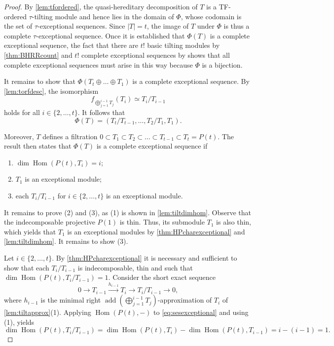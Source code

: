 \documentclass[10pt,twoside, a4paper,reqno]{amsart}
\DeclareMathOperator{\Hom}{Hom}
\DeclareMathOperator{\add}{add}
\theoremstyle{definition}
\begin{document}
\begin{proof}
    By \cref{lem:tfordered}, the quasi-hereditary decomposition of $T$ is a TF-ordered $\tau$-tilting module and hence lies in the domain of $\Phi$, whose codomain is the set of $\tau$-exceptional sequences. Since $|T|=t$, the image of $T$ under $\Phi$ is thus a complete $\tau$-exceptional sequence. Once it is established that $\Phi(T)$ is a complete exceptional sequence, the fact that there are $t!$ basic tilting modules by \cref{thm:BHRRcount} and $t!$ complete exceptional sequences by \cite[Introduction Thm.]{HillePloog2019} shows that all complete exceptional sequences must arise in this way because $\Phi$ is a bijection. 
    
    It remains to show that $\Phi(T_t \oplus \dots \oplus T_1)$ is a complete exceptional sequence. By \cref{lem:torfdesc}, the isomorphism
    \[ f_{\bigoplus_{j=1}^{i-1} T_j} (T_i) \simeq T_i/T_{i-1} \] 
	holds for all $i \in \{2, \dots, t\}$. It follows that 
	\[ \Phi(T) = (T_t/T_{t-1}, \dots, T_2/T_1, T_1). \]
	
	Moreover, $T$ defines a filtration $0 \subset T_1 \subset T_2 \subset \dots \subset T_{t-1} \subset T_t = P(t)$. The result \cite[Prop. 3.5]{HillePloog2019} then states that $\Phi(T)$ is a complete exceptional sequence if 
    \begin{enumerate}
        \item $\dim \Hom(P(t), T_i)=i$;
        \item $T_1$ is an exceptional module;
        \item each $T_i /T_{i-1}$ for $i \in \{ 2, \dots, t\}$ is an exceptional module.
    \end{enumerate}
    It remains to prove (2) and (3), as (1) is shown in \cref{lem:tiltdimhom}. Observe that the indecomposable projective $P(1)$ is thin. Thus, its submodule $T_1$ is also thin, which yields that $T_1$ is an exceptional modules by \cref{thm:HPcharexceptional} and \cref{lem:tiltdimhom}. It remains to show (3).
    
    Let $i \in \{2, \dots, t\}$. By \cref{thm:HPcharexceptional} it is necessary and sufficient to show that each $T_i/T_{i-1}$ is indecomposable, thin and such that $\dim \Hom(P(t), T_i/T_{i-1})=1$. Consider the short exact sequence
    \begin{equation}\label{eq:sesexceptional} 0 \to T_{i-1} \xrightarrow{h_{i-1}} T_i \to T_i/T_{i-1} \to 0, \end{equation}
    where $h_{i-1}$ is the minimal right $\add(\bigoplus_{j=1}^{i-1} T_j)$-approximation of $T_i$ of \cref{lem:tiltapprox}(1). Applying $\Hom(P(t),-)$ to \cref{eq:sesexceptional} and using (1), yields
    \[ \dim \Hom(P(t), T_i/T_{i-1}) = \dim \Hom(P(t), T_i) - \dim \Hom(P(t), T_{i-1}) = i-(i-1)=1. \]
    

\end{proof}
\end{document}
